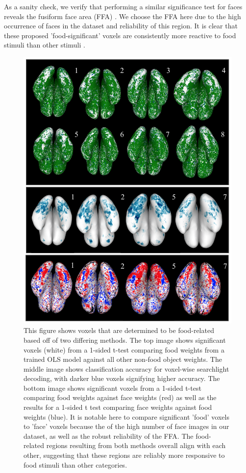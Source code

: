 \documentclass[../thesis.tex]{subfiles}
\begin{document}
As a sanity check, we verify that performing a similar significance test for faces reveals the fusiform face area (FFA) \cite{Kanwisher1997}. We choose the FFA here due to the high occurrence of faces in the dataset and reliability of this region. It is clear that these proposed 'food-significant' voxels are consistently more reactive to food stimuli than other stimuli . 
    \begin{figure}
        \centering
        \includegraphics[scale=0.55]{fig2.png}
        \caption{This figure shows voxels that are determined to be food-related based off of two differing methods. The top image shows significant voxels (white) from a 1-sided t-test comparing food weights from a trained OLS model against all other non-food object weights. The middle image shows classification accuracy for voxel-wise searchlight decoding, with darker blue voxels signifying higher accuracy. The bottom image shows significant voxels from a 1-sided t-test comparing food weights against face weights (red) as well as the results for a 1-sided t test comparing face weights against food weights (blue). It is notable here to compare significant 'food' voxels to 'face' voxels because the of the high number of face images in our dataset, as well as the robust reliability of the FFA. The food-related regions resulting from both methods overall align with each other, suggesting that these regions are reliably more responsive to food stimuli than other categories. } \label{fig1}
    \end{figure}
\end{document}
